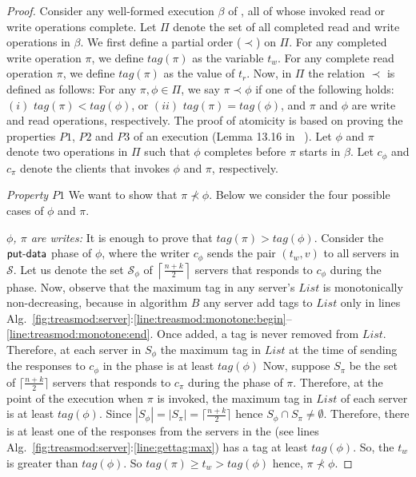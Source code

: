 			\begin{proof}
Consider any well-formed execution $\beta$ of \treasmod, all of whose invoked read or write operations complete. Let $\Pi$ denote the set of all completed read and write operations in $\beta$. We first define a partial order ($\prec$) on $\Pi$. 
For any completed write operation $\pi$, we define $tag(\pi)$ as the variable  $t_w$. For any complete read operation $\pi$, we define $tag(\pi)$ as the value of $t_r$. 
Now, in $\Pi$ the relation $\prec$ is defined as follows: For any $\pi, \phi \in \Pi$, we say $\pi \prec \phi$  if 
one of the following holds: $(i)$  $tag(\pi)  < tag(\phi)$, or $(ii)$ $tag(\pi) = tag(\phi)$, and  $\pi$ and $\phi$ are write and read 
operations, respectively. The proof of atomicity is based on proving 				
 the properties $P1$, $P2$ and $P3$ of an execution (Lemma 13.16 in ~\cite{Lynch1996}). Let $\phi$ and $\pi$ denote two operations in $\Pi$ such that $\phi$ completes before $\pi$ starts in $\beta$.  Let  $c_{\phi}$ and $c_{\pi}$ denote the clients that invokes $\phi$ and $\pi$, respectively. 

\emph{Property $P1$} We want to show that $\pi \not\prec \phi$. Below we consider the four possible cases of $\phi$ and $\pi$.

\emph{ $\phi$, $\pi$ are writes:} It is enough to prove that $tag(\pi) > tag(\phi)$. Consider the $\act{put-data}$ phase of $\phi$, where the writer $c_{\phi}$  sends the pair $(t_w, v)$ to all 
servers in $\mathcal{S}$. Let us denote the  set $\mathcal{S}_{\phi}$ of $\left\lceil \frac{n+k}{2} \right\rceil$ servers  that responds to $c_{\phi}$ during the  phase.  
Now, observe that the maximum tag in any server's $List$ is monotonically non-decreasing, because in algorithm $B$  
any server add tags to  $List$  only in lines 
Alg.~\ref{fig:treasmod:server}:\ref{line:treasmod:monotone:begin}--\ref{line:treasmod:monotone:end}.  Once added, a tag is never removed from $List$.
Therefore, at  each server in $S_{\phi}$ the maximum tag in $List$ at the time of 
sending the responses to $c_{\phi}$ in the   phase is at least $tag(\phi)$ 
 Now, suppose $S_{\pi}$ be 
the set of $\lceil \frac{n+k}{2} \rceil$ servers that responds to $c_{\pi}$ during the  phase of $\pi$. 
 Therefore, at the point of the execution when $\pi$ is invoked, the maximum
tag in  $List$ of each server is at least $tag(\phi)$. Since $|S_{\phi}| = | S_{\pi}| = \lceil \frac{n+k}{2} \rceil$  hence 
$S_{\phi} \cap S_{\pi} \neq \emptyset $. Therefore, there is at least one of the  responses from the servers in the 
(see lines Alg.~\ref{fig:treasmod:server}:\ref{line:gettag:max}) has a tag at least $tag(\phi)$. So, the $t_w$ is greater than $tag(\phi)$. So $tag(\pi) \geq t_w > tag(\phi)$ hence, $\pi \not\prec \phi$.
 

\end{proof}
